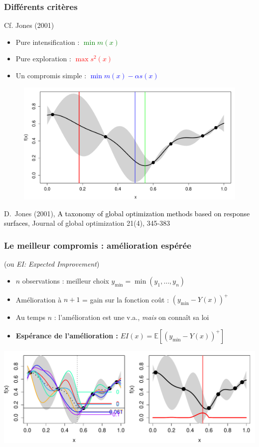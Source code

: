 \begin{frame}
\frametitle{Différents critères}
\begin{block}{Cf. Jones (2001)}
 \begin{itemize}
  \item Pure intensification : \textcolor{green}{$\min m(x)$}
  \item Pure exploration : \textcolor{red}{$\max s^2(x)$}
  \item Un compromis simple : \textcolor{blue}{$\min m(x) - \alpha s(x)$}
  \end{itemize}
\end{block}
  \begin{figure}
	\centering
\includegraphics[width=.63\textwidth]{fig/taxo.pdf}
\end{figure}
\scriptsize{
 \begin{thebibliography}{7}
\beamertemplatearticlebibitems
     D.~Jones (2001), \textcolor{black}{A taxonomy of global optimization methods based on response surfaces},
         \newblock Journal of global optimization 21(4), 345-383
 \end{thebibliography}
}
\end{frame}
\begin{frame}
\frametitle{Le meilleur compromis : amélioration espérée}
\begin{block}{ (ou \textit{EI: Expected Improvement})}
 \begin{itemize}
  \item $n$ observations : meilleur choix $y_{\min} = \min(y_1, \ldots, y_n)$
  \item Amélioration à $n+1$ = gain sur la fonction coût : $\left( y_{\min} - Y(x) \right)^+$
  \item Au temps $n$ : l'amélioration est une v.a., \textit{mais} on connaît sa loi
  \item \textbf{Espérance de l'amélioration :} $EI(x) = \mathbb{E} \left[ \left(y_{\min} - Y(x) \right)^+ \right]$
 \end{itemize}
\end{block}

\includegraphics[width=\textwidth]{fig/EI2.pdf}
\end{frame}
